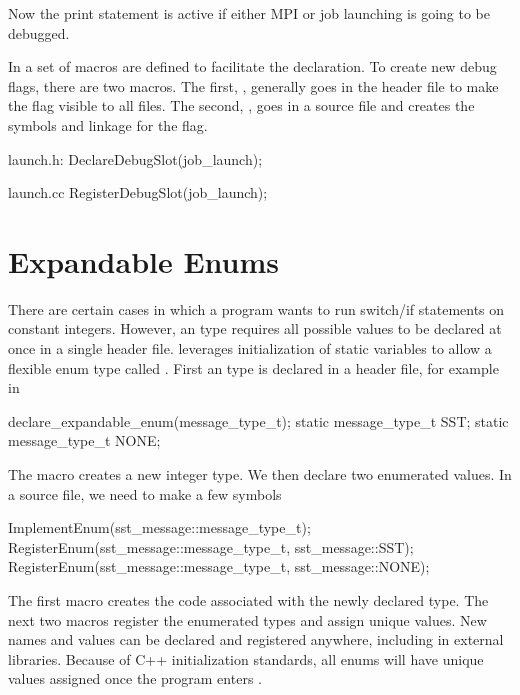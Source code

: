 Now the print statement is active if either MPI or job launching is going to be debugged.

In  a set of macros are defined to facilitate the declaration.
To create new debug flags, there are two macros.
The first, , generally goes in the header file to make the flag visible to all files.
The second, , goes in a source file and creates the symbols and linkage for the flag.

\begin{CppCode}
launch.h:
DeclareDebugSlot(job_launch);

launch.cc
RegisterDebugSlot(job_launch);
\end{CppCode}

\section{Expandable Enums}
There are certain cases in which a program wants to run switch/if statements on constant integers.
However, an  type requires all possible values to be declared at once in a single header file.
\sprockit leverages initialization of static variables to allow a flexible enum type called .
First an  type is declared in a header file, for example in 

\begin{CppCode}
  declare_expandable_enum(message_type_t);
  static message_type_t SST;
  static message_type_t NONE;
\end{CppCode}

The macro creates a new integer type.
We then declare two enumerated values.
In a source file, we need to make a few symbols

\begin{CppCode}
ImplementEnum(sst_message::message_type_t);
RegisterEnum(sst_message::message_type_t, sst_message::SST);
RegisterEnum(sst_message::message_type_t, sst_message::NONE);
\end{CppCode}

The first macro creates the code associated with the newly declared type.
The next two macros register the enumerated types and assign unique values.
New names and values can be declared and registered anywhere, including in external libraries.
Because of C++ initialization standards, all enums will have unique values assigned once the program enters .

